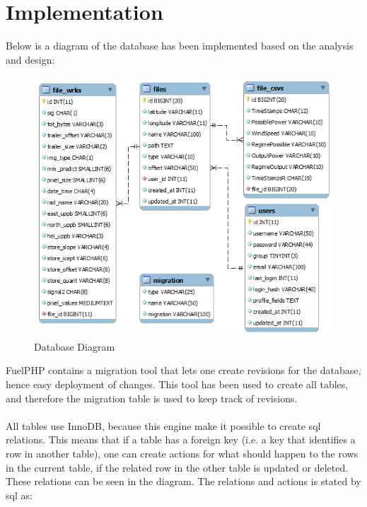 \section{Implementation}

Below is a diagram of the database has been implemented based on the analysis and design:\\
\begin{figure}[htbp]
   \centering
   \includegraphics[width=1\linewidth]{figure/db}
   \caption{Database Diagram}
\end{figure}
FuelPHP contains a \textsf{migration} tool that lets one create revisions for the database, hence easy deployment of changes. This tool has been used to create all tables, and therefore the \textsf{migration} table is used to keep track of revisions.\\\\

All tables use \textsf{InnoDB}, because this engine make it possible to create sql relations. This means that if a table has a foreign key (i.e. a key that identifies a row in another table), one can create actions for what should happen to the rows in the current table, if the related row in the other table is \textsf{updated} or \textsf{deleted}.\\
These relations can be seen in the diagram. The relations and actions is stated by sql as:\\\\

